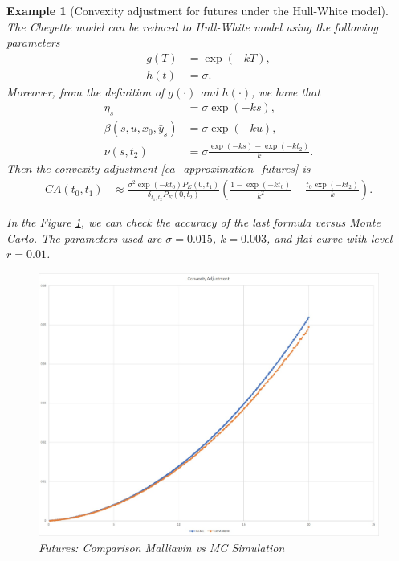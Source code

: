 \documentclass[a4paper,10pt]{article}
\newtheorem{example}[theorem]{Example}
\newcommand{\1}{\mathbf{1}}
\begin{document}
\begin{example}[Convexity adjustment for futures under the Hull-White model]\label{example_ca_future}
The Cheyette model can be reduced to Hull-White model using the following parameters
\begin{align*}
g(T) &= \exp(-kT), \\
h(t) &= \sigma.
\end{align*}
Moreover, from the definition of $g(\cdot)$ and $h(\cdot)$, we have that
\begin{align*}
\eta_s &= \sigma \exp(-ks),\\
\beta(s,u, x_0, \bar{y}_s) &= \sigma \exp(-ku),\\
\nu(s,t_2) &= \sigma \frac{\exp(-ks) - \exp(-kt_2)}{k}.
\end{align*}
Then the convexity adjustment \eqref{ca_approximation_futures} is
\begin{align*}
CA(t_0,t_1) & \approx \frac{\sigma^{2} \exp(-k t_0)  P_{E}(0,t_1)}{\delta_{t_1,t_2} P_{E}(0,t_2)} \left(\frac{1 - \exp(- k t_0)}{k^{2}} - \frac{t_0 \exp(-k t_2)}{k} \right).   
\end{align*}

In the Figure \ref{fig:Futures}, we can check the accuracy of the last formula versus Monte Carlo. The parameters used are $\sigma=0.015$, $k=0.003$, and flat curve with level $r=0.01$.

\begin{figure}[H]
	\begin{center}
		\includegraphics[scale=0.3]{Figures/future_convexity.jpg}
	\end{center}
	\caption{Futures: Comparison Malliavin vs MC Simulation}
	\label{fig:Futures}
\end{figure} 
\end{example}
\end{document}
